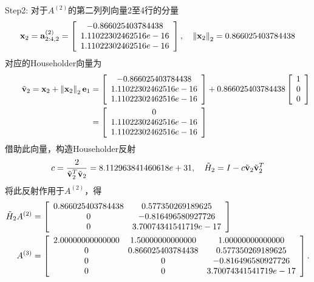 \documentclass[UTF8]{ctexart}
\begin{document}
Step2: 对于$A^{(2)}$的第二列列向量2至4行的分量
\begin{align}
\mathbf{x}_{2}=\mathbf{a}_{2: 4,2}^{(2)}=\left[\begin{array}{c}
-0.866025403784438 \\
1.11022302462516e-16 \\
1.11022302462516e-16
\end{array}\right], \quad\left\|\mathbf{x}_{2}\right\|_{2}=0.866025403784438 \notag
\end{align}
对应的Householder向量为
\begin{align}
\begin{aligned}
	\qquad \tilde{\mathbf{v}}_{2}=\mathbf{x}_{2}+\left\|\mathbf{x}_{2}\right\|_{2} \mathbf{e}_{1} &=\left[\begin{array}{c}
	-0.866025403784438 \\
	1.11022302462516e-16 \\
	1.11022302462516e-16
	\end{array}\right]+0.866025403784438\left[\begin{array}{r}
	1 \\
	0 \\
	0 
	\end{array}\right]\\
	&=\left[\begin{array}{c}
	0 \\
	1.11022302462516e-16 \\
	1.11022302462516e-16
	\end{array}\right] \notag
\end{aligned}	
\end{align}
借助此向量，构造Householder反射
\begin{align}
c=\frac{2}{\tilde{\mathbf{v}}_{2}^{T} \tilde{\mathbf{v}}_{2}}=8.112963841460618e+31, \quad \tilde{H}_{2}=I-c \tilde{\mathbf{v}}_{2} \tilde{\mathbf{v}}_{2}^{T} \notag
\end{align}
将此反射作用于$A^{(2)}$，得
\begin{align}
\begin{aligned}
	\tilde{H}_{2} A^{(2)} &= 
	\left[\begin{array}{cc}
	0.866025403784438 &	0.577350269189625 \\
	0 &	-0.816496580927726 \\
	0 &	3.70074341541719e-17
	\end{array}\right] \notag \\
	A^{(3)} &=  
	\left[\begin{array}{ccc}
	2.00000000000000 &	1.50000000000000 &	1.00000000000000 \\
	0 &	0.866025403784438 &	0.577350269189625 \\
	0 &	0 &	-0.816496580927726 \\
	0 &	0 &	3.70074341541719e-17
	\end{array}\right].\notag
\end{aligned}
\end{align}
\end{document}
